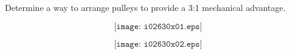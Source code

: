 

Determine a way to arrange pulleys to provide a 3:1 mechanical advantage.







$$\texttt{[image: i02630x01.eps]}$$







$$\texttt{[image: i02630x02.eps]}$$




